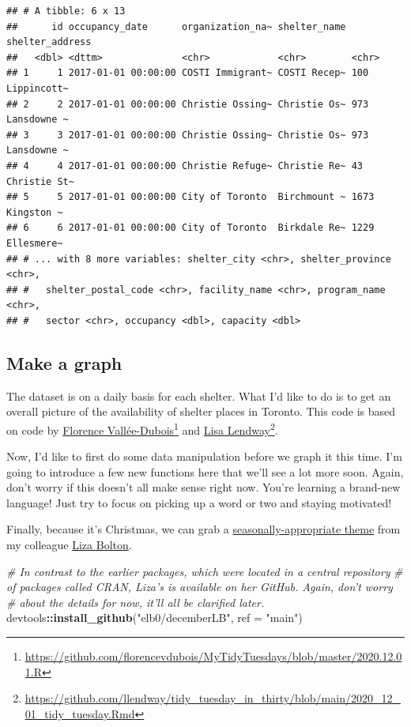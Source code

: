 \documentclass[
]{book}
\newenvironment{Shaded}{\begin{snugshade}}{\end{snugshade}}
\newcommand{\CommentTok}[1]{\textcolor[rgb]{0.56,0.35,0.01}{\textit{#1}}}
\newcommand{\DataTypeTok}[1]{\textcolor[rgb]{0.13,0.29,0.53}{#1}}
\newcommand{\KeywordTok}[1]{\textcolor[rgb]{0.13,0.29,0.53}{\textbf{#1}}}
\newcommand{\NormalTok}[1]{#1}
\newcommand{\OperatorTok}[1]{\textcolor[rgb]{0.81,0.36,0.00}{\textbf{#1}}}
\newcommand{\StringTok}[1]{\textcolor[rgb]{0.31,0.60,0.02}{#1}}
\begin{document}
\begin{verbatim}
## # A tibble: 6 x 13
##      id occupancy_date      organization_na~ shelter_name shelter_address
##   <dbl> <dttm>              <chr>            <chr>        <chr>          
## 1     1 2017-01-01 00:00:00 COSTI Immigrant~ COSTI Recep~ 100 Lippincott~
## 2     2 2017-01-01 00:00:00 Christie Ossing~ Christie Os~ 973 Lansdowne ~
## 3     3 2017-01-01 00:00:00 Christie Ossing~ Christie Os~ 973 Lansdowne ~
## 4     4 2017-01-01 00:00:00 Christie Refuge~ Christie Re~ 43 Christie St~
## 5     5 2017-01-01 00:00:00 City of Toronto  Birchmount ~ 1673 Kingston ~
## 6     6 2017-01-01 00:00:00 City of Toronto  Birkdale Re~ 1229 Ellesmere~
## # ... with 8 more variables: shelter_city <chr>, shelter_province <chr>,
## #   shelter_postal_code <chr>, facility_name <chr>, program_name <chr>,
## #   sector <chr>, occupancy <dbl>, capacity <dbl>
\end{verbatim}

\hypertarget{make-a-graph-1}{%
\subsection{Make a graph}\label{make-a-graph-1}}

The dataset is on a daily basis for each shelter. What I'd like to do is to get an overall picture of the availability of shelter places in Toronto. This code is based on code by \href{https://florencevdubois.github.io}{Florence Vallée-Dubois}\footnote{\url{https://github.com/florencevdubois/MyTidyTuesdays/blob/master/2020.12.01.R}} and \href{https://lisalendway.netlify.app}{Lisa Lendway}\footnote{\url{https://github.com/llendway/tidy_tuesday_in_thirty/blob/main/2020_12_01_tidy_tuesday.Rmd}}.

Now, I'd like to first do some data manipulation before we graph it this time. I'm going to introduce a few new functions here that we'll see a lot more soon. Again, don't worry if this doesn't all make sense right now. You're learning a brand-new language! Just try to focus on picking up a word or two and staying motivated!

Finally, because it's Christmas, we can grab a \href{https://github.com/elb0/decemberLB}{seasonally-appropriate theme} from my colleague \href{https://twitter.com/liza_bolton}{Liza Bolton}.

\begin{Shaded}
\begin{Highlighting}[]
\CommentTok{# In contrast to the earlier packages, which were located in a central repository }
\CommentTok{# of packages called CRAN, Liza's is available on her GitHub. Again, don't worry }
\CommentTok{# about the details for now, it'll all be clarified later.}
\NormalTok{devtools}\OperatorTok{::}\KeywordTok{install_github}\NormalTok{(}\StringTok{"elb0/decemberLB"}\NormalTok{, }\DataTypeTok{ref =} \StringTok{"main"}\NormalTok{)}
\end{Highlighting}
\end{Shaded}
\end{document}
